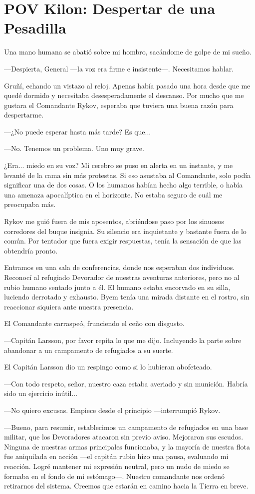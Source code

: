 \chapter{POV Kilon: Despertar de una Pesadilla}

Una mano humana se abatió sobre mi hombro, sacándome de golpe de mi sueño.

—Despierta, General —la voz era firme e insistente—. Necesitamos hablar.

Gruñí, echando un vistazo al reloj. Apenas había pasado una hora desde que me quedé dormido y necesitaba desesperadamente el descanso. Por mucho que me gustara el Comandante Rykov, esperaba que tuviera una buena razón para despertarme.

—¿No puede esperar hasta más tarde? Es que...

—No. Tenemos un problema. Uno muy grave.

¿Era... miedo en su voz? Mi cerebro se puso en alerta en un instante, y me levanté de la cama sin más protestas. Si eso asustaba al Comandante, solo podía significar una de dos cosas. O los humanos habían hecho algo terrible, o había una amenaza apocalíptica en el horizonte. No estaba seguro de cuál me preocupaba más.

Rykov me guió fuera de mis aposentos, abriéndose paso por los sinuosos corredores del buque insignia. Su silencio era inquietante y bastante fuera de lo común. Por tentador que fuera exigir respuestas, tenía la sensación de que las obtendría pronto.

Entramos en una sala de conferencias, donde nos esperaban dos individuos. Reconocí al refugiado Devorador de nuestras aventuras anteriores, pero no al rubio humano sentado junto a él. El humano estaba encorvado en su silla, luciendo derrotado y exhausto. Byem tenía una mirada distante en el rostro, sin reaccionar siquiera ante nuestra presencia.

El Comandante carraspeó, frunciendo el ceño con disgusto.

—Capitán Larsson, por favor repita lo que me dijo. Incluyendo la parte sobre abandonar a un campamento de refugiados a su suerte.

El Capitán Larsson dio un respingo como si lo hubieran abofeteado.

—Con todo respeto, señor, nuestro caza estaba averiado y sin munición. Habría sido un ejercicio inútil...

—No quiero excusas. Empiece desde el principio —interrumpió Rykov.

—Bueno, para resumir, establecimos un campamento de refugiados en una base militar, que los Devoradores atacaron sin previo aviso. Mejoraron sus escudos. Ninguna de nuestras armas principales funcionaba, y la mayoría de nuestra flota fue aniquilada en acción —el capitán rubio hizo una pausa, evaluando mi reacción. Logré mantener mi expresión neutral, pero un nudo de miedo se formaba en el fondo de mi estómago—. Nuestro comandante nos ordenó retirarnos del sistema. Creemos que estarán en camino hacia la Tierra en breve.


